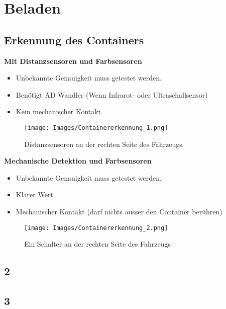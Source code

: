 \section{Beladen}
\subsection{Erkennung des Containers}
\textbf {Mit Distanzsensoren und Farbsensoren}
\begin{itemize}
\item Unbekannte Genauigkeit muss getestet werden.
\item Benötigt AD Wandler (Wenn Infrarot- oder Ultraschallsensor)
\item Kein mechanischer Kontakt
\end{itemize}
\begin{figure} [hbp]
	\centering
	\texttt{[image: Images/Containererkennung\_1.png]}
	\caption{Distanzsensoren an der rechten Seite des Fahrzeugs}
\end{figure}

\textbf {Mechanische Detektion und Farbsensoren}
\begin{itemize}
\item Unbekannte Genauigkeit muss getestet werden.
\item Klarer Wert
\item Mechanischer Kontakt (darf nichts ausser den Container berühren)
\end{itemize}
\begin{figure} [hbp]
	\centering
	\texttt{[image: Images/Containererkennung\_2.png]}
	\caption{Ein Schalter an der rechten Seite des Fahrzeugs}
\end{figure}
\subsection{2}
\subsection{3}